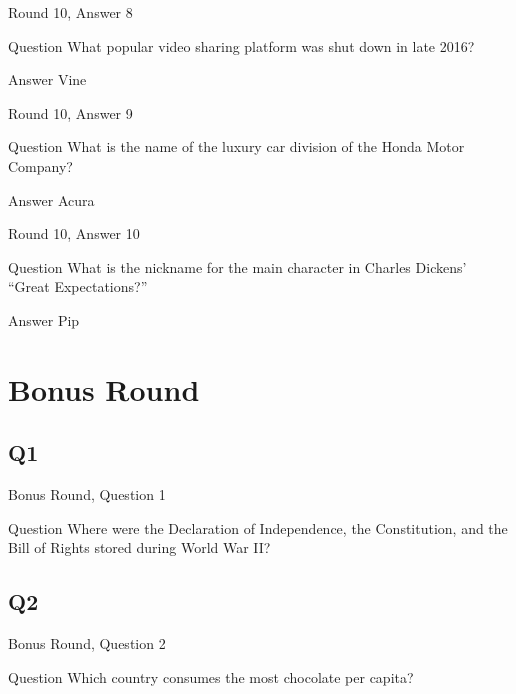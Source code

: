 \documentclass[11pt]{beamer}
\begin{document}
\begin{frame}[t]{Round 10, Answer 8}
\vspace{2em}
\begin{block}{Question}
What popular video sharing platform was shut down in late 2016\@?
\end{block}
\pause{}
\begin{block}{Answer}
Vine
\end{block}
\end{frame}
    

\begin{frame}[t]{Round 10, Answer 9}
\vspace{2em}
\begin{block}{Question}
What is the name of the luxury car division of the Honda Motor Company\@?
\end{block}
\pause{}
\begin{block}{Answer}
Acura
\end{block}
\end{frame}
    

\begin{frame}[t]{Round 10, Answer 10}
\vspace{2em}
\begin{block}{Question}
What is the nickname for the main character in Charles Dickens' ``Great Expectations?''
\end{block}
\pause{}
\begin{block}{Answer}
Pip
\end{block}
\end{frame}
    

\section{Bonus Round}
    

\subsection*{Q1}
\begin{frame}[t]{Bonus Round, Question 1}
\vspace{2em}
\begin{block}{Question}
Where were the Declaration of Independence, the Constitution, and the Bill of Rights stored during World War II\@?
\end{block}
\end{frame}
    

\subsection*{Q2}
\begin{frame}[t]{Bonus Round, Question 2}
\vspace{2em}
\begin{block}{Question}
Which country consumes the most chocolate per capita\@?
\end{block}
\end{frame}
    
\end{document}
